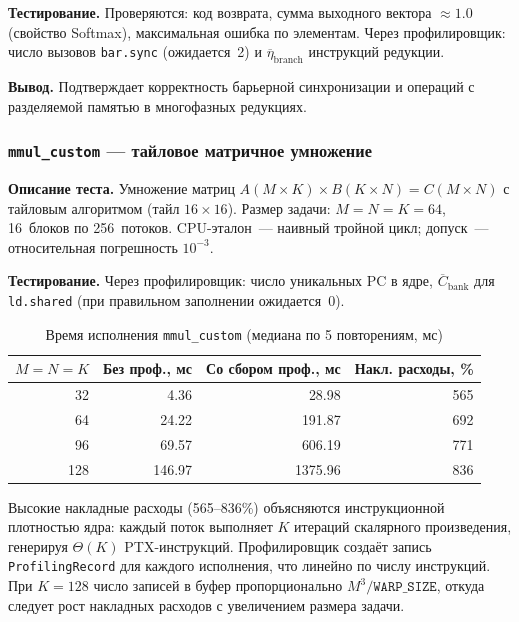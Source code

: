 \textbf{Тестирование.}
Проверяются: код возврата, сумма выходного вектора $\approx 1.0$
(свойство Softmax), максимальная ошибка по элементам. Через
профилировщик: число вызовов \texttt{bar.sync} (ожидается~2)
и $\overline{\eta}_{\mathrm{branch}}$ инструкций редукции.

\textbf{Вывод.}
Подтверждает корректность барьерной синхронизации и операций
с разделяемой памятью в многофазных редукциях.

\subsubsection{\texttt{mmul\_custom} --- тайловое матричное умножение}

\textbf{Описание теста.}
Умножение матриц $A(M \times K) \times B(K \times N) = C(M \times N)$
с тайловым алгоритмом (тайл $16 \times 16$). Размер задачи:
$M = N = K = 64$, 16~блоков по 256~потоков. CPU-эталон~---
наивный тройной цикл; допуск~--- относительная погрешность $10^{-3}$.

\textbf{Тестирование.}
Через профилировщик: число уникальных PC в ядре,
$\overline{C}_{\mathrm{bank}}$ для \texttt{ld.shared}
(при правильном заполнении ожидается~0).

\begin{table}[h]
  \caption{Время исполнения \texttt{mmul\_custom} (медиана по 5 повторениям, мс)}
  \label{tab:mmul_perf}
  \centering
  \begin{tabular}{rrrr}
    \toprule
    $M = N = K$ & Без проф., мс & Со сбором проф., мс & Накл. расходы, \% \\
    \midrule
    32  & 4.36   & 28.98   & 565 \\
    64  & 24.22  & 191.87  & 692 \\
    96  & 69.57  & 606.19  & 771 \\
    128 & 146.97 & 1375.96 & 836 \\
    \bottomrule
  \end{tabular}
\end{table}

Высокие накладные расходы (565--836\%) объясняются инструкционной плотностью ядра:
каждый поток выполняет $K$ итераций скалярного произведения, генерируя $\Theta(K)$
PTX-инструкций. Профилировщик создаёт запись \texttt{ProfilingRecord}
для каждого исполнения, что линейно по числу инструкций. При $K=128$
число записей в буфер пропорционально $M^3/\texttt{WARP\_SIZE}$,
откуда следует рост накладных расходов с увеличением размера задачи.


